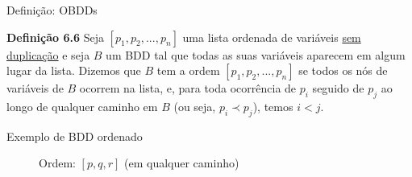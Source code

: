 \expandafter\documentclass\expandafter[table, usenames, svgnames, dvipsnames,14pt, \classopts]{beamer}
\begin{document}
\begin{frame}{Definição: OBDDs}

    \begin{block}{\textbf{Definição 6.6}}
        Seja $[p_1,p_2,...,p_n]$ uma lista ordenada de variáveis \underline{sem duplicação} e seja $B$ um BDD tal que todas as suas variáveis aparecem em algum lugar da lista. Dizemos que $B$ tem a ordem $[p_1,p_2,...,p_n]$ se todos os nós de variáveis de $B$ ocorrem na lista, e, para toda ocorrência de $p_i$ seguido de $p_j$ ao longo de qualquer caminho em $B$ (ou seja, $p_i \prec p_j$), temos $i < j$.
    \end{block}

\end{frame}

\begin{frame}{Exemplo de BDD ordenado}

    \begin{figure}
    
        \caption{Ordem: $[p, q, r]$ (em qualquer caminho)}
    

    \end{figure}

\end{frame}
    
\end{document}
